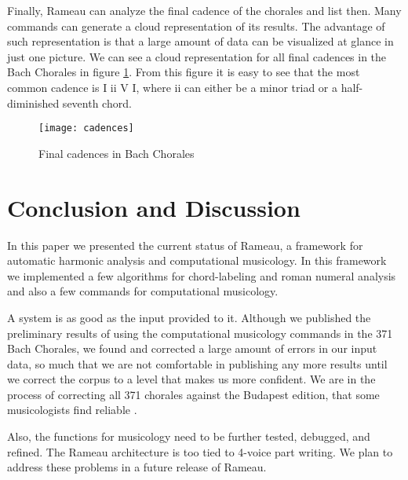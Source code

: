 Finally, Rameau can analyze the final cadence of the chorales and list
then. Many commands can generate a cloud representation of its
results. The advantage of such representation is that a large amount
of data can be visualized at glance in just one picture. We can see a
cloud representation for all final cadences in the Bach Chorales in
figure \ref{fig:cadences}. From this figure it is easy to see that the
most common cadence is I ii V I, where ii can either be a minor triad
or a half-diminished seventh chord.

\begin{figure}
  \centering
  \texttt{[image: cadences]}
  \caption{Final cadences in Bach Chorales}
  \label{fig:cadences}
\end{figure}

\section{Conclusion and Discussion}
\label{sec:conclusion}

In this paper we presented the current status of Rameau, a framework
for automatic harmonic analysis and computational musicology. In this
framework we implemented a few algorithms for chord-labeling and roman
numeral analysis and also a few commands for computational musicology.

A system is as good as the input provided to it. Although we published
the preliminary results of using the computational musicology commands
in the 371 Bach Chorales, we found and corrected a large amount of
errors in our input data, so much that we are not comfortable in
publishing any more results until we correct the corpus to a level
that makes us more confident. We are in the process of correcting all
371 chorales against the Budapest edition, that some musicologists
find reliable \cite{fitsioris.ea08:parallel}.

Also, the functions for musicology need to be further tested, debugged,
and refined. The Rameau architecture is too tied to 4-voice part
writing. We plan to address these problems in a future release of
Rameau.
